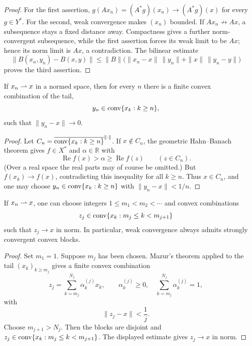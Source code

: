 \begin{proof}
For the first assertion, $g(Ax_n)=(A^*g)(x_n)\to(A^*g)(x)$ for every
$g\in Y^*$.  For the second, weak convergence makes $(x_n)$ bounded.  If
$Ax_n\not\to Ax$, a subsequence stays a fixed distance away.  Compactness gives
a further norm-convergent subsequence, while the first assertion forces its
weak limit to be $Ax$; hence its norm limit is $Ax$, a contradiction.  The
bilinear estimate
\[
  \|B(x_n,y_n)-B(x,y)\|
  \le \|B\|\bigl(\|x_n-x\|\,\|y_n\|
                  +\|x\|\,\|y_n-y\|\bigr)
\]
proves the third assertion.
\end{proof}

\begin{notetheorem}
If $x_n\rightharpoonup x$ in a normed space, then for every $n$ there is a finite
convex combination of the tail,
\[
  y_n\in\operatorname{conv}\{x_k:k\ge n\},
\]
such that $\|y_n-x\|\to0$.
\end{notetheorem}

\begin{proof}
Let $C_n=\overline{\operatorname{conv}\{x_k:k\ge n\}}^{\|\cdot\|}$.  If $x\notin C_n$,
the geometric Hahn--Banach theorem gives $f\in X^*$ and $\alpha\in\mathbb R$
with
\[
  \operatorname{Re}f(x)>\alpha
  \ge \operatorname{Re}f(z)
  \qquad(z\in C_n).
\]
(Over a real space the real parts may of course be omitted.)  But
$f(x_k)\to f(x)$, contradicting this inequality for all $k\ge n$.  Thus
$x\in C_n$, and one may choose
$y_n\in\operatorname{conv}\{x_k:k\ge n\}$ with $\|y_n-x\|<1/n$.
\end{proof}

\begin{notecorollary}
If $x_n\rightharpoonup x$, one can choose integers
$1\le m_1<m_2<\cdots$ and convex combinations
\[
  z_j\in\operatorname{conv}\{x_k:m_j\le k<m_{j+1}\}
\]
such that $z_j\to x$ in norm.  In particular, weak convergence always admits
strongly convergent convex blocks.
\end{notecorollary}

\begin{proof}
Set $m_1=1$.  Suppose $m_j$ has been chosen.  Mazur's theorem applied to the
tail $(x_k)_{k\ge m_j}$ gives a finite convex combination
\[
  z_j=\sum_{k=m_j}^{N_j}\alpha_k^{(j)}x_k,
  \qquad
  \alpha_k^{(j)}\ge0,
  \quad
  \sum_{k=m_j}^{N_j}\alpha_k^{(j)}=1,
\]
with
\[
  \|z_j-x\|<\frac1j.
\]
Choose $m_{j+1}>N_j$.  Then the blocks are disjoint and
$z_j\in\operatorname{conv}\{x_k:m_j\le k<m_{j+1}\}$.  The displayed estimate gives
$z_j\to x$ in norm.
\end{proof}

